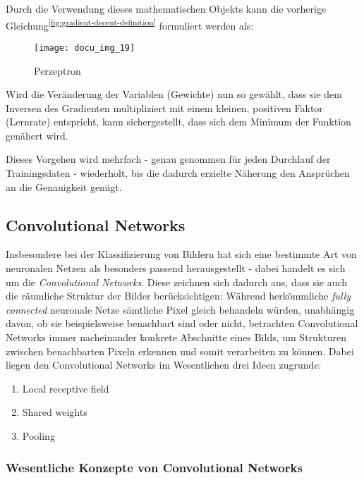 Durch die Verwendung dieses mathematischen Objekts kann die vorherige Gleichung\textsuperscript{\ref{fig:gradient-decent-definition}} formuliert werden als:

\begin{figure}[h]
    \centering
    \texttt{[image: docu\_img\_19]}
    \caption{Perzeptron}
    \label{fig:gradient-decent-defition-2}
\end{figure}

Wird die Veränderung der Variablen (Gewichte) nun so gewählt, dass sie dem Inversen des Gradienten multipliziert mit
einem kleinen, positiven Faktor (Lernrate) entspricht, kann sichergestellt, dass sich dem Minimum der Funktion
genähert wird.

Dieses Vorgehen wird mehrfach - genau genommen für jeden Durchlauf der Trainingsdaten - wiederholt, bis die dadurch erzielte Näherung den
Ansprüchen an die Genauigkeit genügt.

\subsection{Convolutional Networks}

Insbesondere bei der Klassifizierung von Bildern hat sich eine bestimmte Art von neuronalen Netzen als besonders passend
herausgestellt - dabei handelt es sich um die \textit{Convolutional Networks}. Diese zeichnen sich dadurch aus,
dass sie auch die räumliche Struktur der Bilder berücksichtigen: Während herkömmliche \textit{fully connected} neuronale Netze
sämtliche Pixel gleich behandeln würden, unabhängig davon, ob sie beispielsweise benachbart sind oder nicht, betrachten
Convolutional Networks immer nacheinander konkrete Abschnitte eines Bilds, um Strukturen zwischen benachbarten Pixeln
erkennen und somit verarbeiten zu können.
Dabei liegen den Convolutional Networks im Wesentlichen drei Ideen zugrunde:

\begin{enumerate}
    \item{Local receptive field}
    \item{Shared weights}
    \item{Pooling}
\end{enumerate}

\subsubsection{Wesentliche Konzepte von Convolutional Networks}


